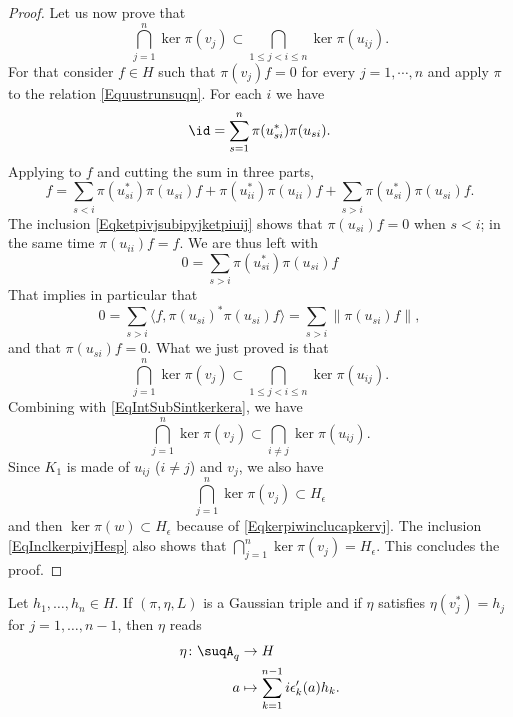 \begin{proof}
    Let us now prove that
    \begin{equation}
        \bigcap_{j=1}^n\ker\pi(v_j)\subset\bigcap_{1\leq j<i\leq n}\ker\pi(u_{ij}).
    \end{equation}
    For that consider $f\in H$ such that $\pi(v_j)f=0$ for every $j=1,\cdots,n$ and apply $\pi$ to the relation \eqref{Equustrunsuqn}. For each $i$ we have
    \begin{equation}
        \id=\sum_{s=1}^n\pi(u_{si}^*)\pi(u_{si}).
    \end{equation}
    Applying to $f$ and cutting the sum in three parts,
    \begin{equation}
        f=\sum_{s<i}\pi(u_{si}^*)\pi(u_{si})f+\pi(u_{ii}^*)\pi(u_{ii})f+\sum_{s>i}\pi(u_{si}^*)\pi(u_{si})f.
    \end{equation}
    The inclusion \eqref{Eqketpivjsubipyjketpiuij} shows that $\pi(u_{si})f=0$ when $s<i$; in the same time $\pi(u_{ii})f=f$. We are thus left with
    \begin{equation}
        0=\sum_{s>i}\pi(u_{si}^*)\pi(u_{si})f
    \end{equation}
    That implies in particular that 
    \begin{equation}
        0=\sum_{s>i}\langle f, \pi(u_{si})^*\pi(u_{si})f\rangle =\sum_{s>i}\| \pi(u_{si})f \|,
    \end{equation}
    and that $\pi(u_{si})f=0$. What we just proved is that
    \begin{equation}
        \bigcap_{j=1}^n\ker\pi(v_j)\subset\bigcap_{1\leq j<i\leq n}\ker\pi(u_{ij}).
    \end{equation}
    Combining with \eqref{EqIntSubSintkerkera}, we have
    \begin{equation}
        \bigcap_{j=1}^n\ker\pi(v_j)\subset\bigcap_{i\neq j}\ker\pi(u_{ij}).
    \end{equation}
    Since $K_1$ is made of $u_{ij}$ ($i\neq j$) and $v_j$, we also have 
    \begin{equation}        \label{EqInclkerpivjHesp}
        \bigcap_{j=1}^n\ker\pi(v_j)\subset H_{\epsilon}
    \end{equation}
    and then $\ker \pi(w)\subset H_{\epsilon}$ because of \eqref{Eqkerpiwinclucapkervj}. The inclusion \eqref{EqInclkerpivjHesp} also shows that $\bigcap_{j=1}^n\ker\pi(v_j)=H_{\epsilon}$. This concludes the proof.
\end{proof}

\begin{proposition}
    Let $h_1,\ldots,h_n\in H$. If $(\pi,\eta,L)$ is a Gaussian triple and if $\eta$ satisfies $\eta(v_j^*)=h_j$ for $j=1,\ldots,n-1$, then $\eta$ reads
    \begin{equation}        \label{EqDefEtaCocyGaussU}
        \begin{aligned}
            \eta\colon \suqA_q&\to H \\
            a&\mapsto \sum_{k=1}^{n-1}i\epsilon_k'(a)h_k.
        \end{aligned}
    \end{equation}
\end{proposition}

